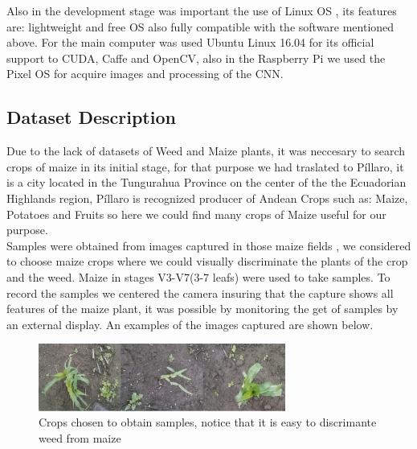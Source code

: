 \documentclass[conference]{IEEEtran}
\begin{document}
Also in the development stage was important the use of Linux OS , its features are: lightweight and free OS also fully compatible with the software mentioned above. For the main computer was used Ubuntu Linux 16.04 for its official support to CUDA, Caffe and OpenCV, also in the Raspberry Pi we used the Pixel OS for acquire images and processing of the CNN.
\\

\subsection{Dataset Description}
Due to the lack of datasets of Weed and Maize plants, it was neccesary to search crops of maize in its initial stage, for that purpose we had traslated to P\'illaro, it is a city located in the Tungurahua Province on the center of the  the Ecuadorian Highlands region, P\'illaro is recognized producer of Andean Crops such as: Maize, Potatoes and Fruits so here we could find many crops of Maize useful for our purpose. \\

Samples were obtained from images captured in those maize fields , we considered to choose maize crops where we could visually discriminate the plants of the crop and the weed. Maize in stages V3-V7(3-7 leafs) \cite{Fassio} were used to take samples. To record the samples we centered the camera insuring that the capture shows all features of the maize plant, it was possible by monitoring the get of samples by an external display. An examples of the images captured are shown below. 
\\

	\begin{figure}[h]
	\centering
	\includegraphics[width=3.2in]{entradamaiz}
	\caption{Crops chosen to obtain samples, notice that it is easy to discrimante weed from maize}
	\label{fig_sim}
	\end{figure}
	
\end{document}
